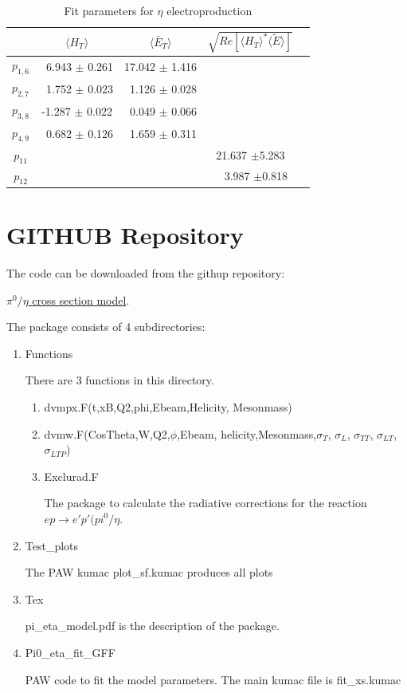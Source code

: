 \documentclass[prc,floatfix,superscriptaddress]{revtex4}
\newcommand{\GPDtE}{\langle \tilde{E} \rangle}
\newcommand{\GPDHT}{\langle H_T \rangle}
\newcommand{\ETbar}{\langle \bar{E}_T \rangle}
\begin{document}
\begin{table}[h!]
\caption{Fit parameters for $\eta$ electroproduction}
\begin{tabular}{   | c | c | c |  c | c |}
\hline
                  &  $\GPDHT$                  & $ \ETbar$ &  $\sqrt{Re[\GPDHT^*\GPDtE]}$    \\
\hline
$p_{1,6}$  & \ 6.943 $\pm$ 0.261  & 17.042  $\pm$ 1.416 &    \\
$p_{2,7}$  &\  1.752  $\pm$ 0.023& \ 1.126  $\pm$ 0.028&    \\
$p_{3,8}$   & -1.287  $\pm$ 0.022& \  0.049 $\pm$ 0.066&    \\
$p_{4,9}$  & \  0.682 $\pm$ 0.126 &\  1.659  $\pm$  0.311 &  \\
\hline
$p_{11}$  &   &   &   21.637  $\pm$5.283 \\
$p_{12}$  &   &   & \ \   3.987  $\pm$0.818 \\
\hline
\end{tabular}
\label{Tab:eta_fit_parameters}
\end{table}

\section{GITHUB Repository}

The code can be downloaded from the githup repository:

\href{https://github.com/vkubarovsky/Model-for-the-pi0-eta-exclusive-cross-section}{$\pi^0/\eta$ cross section model}.

The package consists of 4 subdirectories:
\begin{enumerate}
\item Functions

There are 3 functions in this directory.
\begin{enumerate}
\item dvmpx.F(t,xB,Q2,phi,Ebeam,Helicity, Mesonmass)
\item dvmw.F(CosTheta,W,Q2,$\phi$,Ebeam, helicity,Mesonmass,$\sigma_{T}$, $\sigma_{L}$, $\sigma_{TT}$, $\sigma_{LT}$, $\sigma_{LTP}$)
\item Exclurad.F

The package to calculate the radiative corrections for the reaction $ep\to e'p'(pi^0/\eta$.
\end{enumerate}
\item Test\_plots

The PAW kumac plot\_sf.kumac produces all plots
\item Tex

pi\_eta\_model.pdf  is the description of the package.
\item Pi0\_eta\_fit\_GFF

PAW code to fit the model parameters. The main kumac file is fit\_xs.kumac
\end{enumerate}
\end{document}
